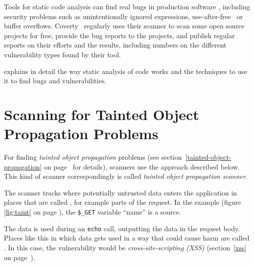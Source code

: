 Tools for static code analysis can find real bugs in production software \cite{findbugs, evaluating}, including security problems such as unintentionally ignored expressions, use-after-free~\cite{use-after-free-definition} or buffer overflows. Coverty~\cite{coverity-report} regularly uses their scanner to scan some open source projects for free, provide the bug reports to the projects, and publish regular reports on their efforts and the results, including numbers on the different vulnerability types found by their tool.

\cite{chess-west} explains in detail the way static analysis of code works and the techniques to use it to find bugs and vulnerabilities.



\section{Scanning for Tainted Object Propagation Problems}
\label{tainting}

For finding \emph{tainted object propagation} problems (see section~\ref{tainted-object-propagation} on page~\pageref{tainted-object-propagation} for details), scanners use the approach described below.~\cite{finding-security-vulnerabilities, chess-west} This kind of scanner correspondingly is called \emph{tainted object propagation scanner}.

The scanner tracks where potentially untrusted data enters the application in places that are called , for example parts of the request. In the example (figure \ref{fig:taint} on page \pageref{fig:taint}), the \texttt{\$\_GET} variable ``name'' is a source.

The data is used during an \texttt{echo} call, outputting the data in the request body. Places like this in which data gets used in a way that could cause harm are called . In this case, the vulnerability would be \emph{cross-site-scripting (XSS)} (section~\ref{xss} on page~\pageref{xss}).

